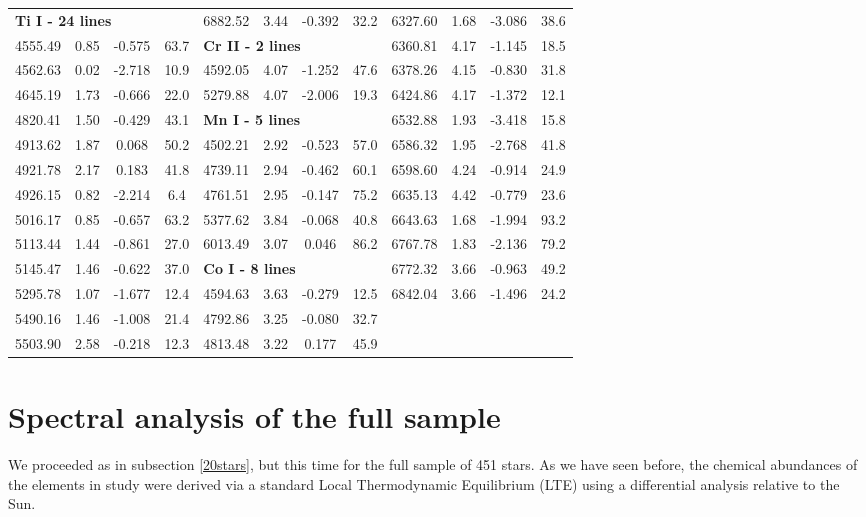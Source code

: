 \documentclass[dvips,12pt,a4paper]{report}
\begin{document}
{{\begin{table}[h]
\begin{tabular}{c c c c | c c c c | c c c c}
\multicolumn{3}{l}{\textbf{Ti I - 24 lines}} & & 6882.52 & 3.44 & -0.392 &  32.2 & 6327.60 & 1.68 & -3.086 &  38.6 \\
4555.49 & 0.85 & -0.575 &  63.7 & \multicolumn{3}{l}{\textbf{Cr II - 2 lines}} &  & 6360.81 & 4.17 & -1.145 &  18.5 \\
4562.63 & 0.02 & -2.718 &  10.9 & 4592.05 & 4.07 & -1.252 &  47.6 & 6378.26 & 4.15 & -0.830 &  31.8 \\
4645.19 & 1.73 & -0.666 &  22.0 & 5279.88 & 4.07 & -2.006 &  19.3 & 6424.86 & 4.17 & -1.372 &  12.1 \\
4820.41 & 1.50 & -0.429 &  43.1 & \multicolumn{3}{l}{\textbf{Mn I - 5 lines}}  &  & 6532.88 & 1.93 & -3.418 &  15.8 \\
4913.62 & 1.87 &  0.068 &  50.2 & 4502.21 & 2.92 & -0.523 &  57.0 & 6586.32 & 1.95 & -2.768 &  41.8 \\
4921.78 & 2.17 &  0.183 &  41.8 & 4739.11 & 2.94 & -0.462 &  60.1 & 6598.60 & 4.24 & -0.914 &  24.9 \\
4926.15 & 0.82 & -2.214 &   6.4 & 4761.51 & 2.95 & -0.147 &  75.2 & 6635.13 & 4.42 & -0.779 &  23.6 \\
5016.17 & 0.85 & -0.657 &  63.2 & 5377.62 & 3.84 & -0.068 &  40.8 & 6643.63 & 1.68 & -1.994 &  93.2 \\
5113.44 & 1.44 & -0.861 &  27.0 & 6013.49 & 3.07 &  0.046 &  86.2 & 6767.78 & 1.83 & -2.136 &  79.2 \\
5145.47 & 1.46 & -0.622 &  37.0 & \multicolumn{3}{l}{\textbf{Co I - 8 lines}} &  & 6772.32 & 3.66 & -0.963 &  49.2 \\
5295.78 & 1.07 & -1.677 &  12.4 & 4594.63 & 3.63 & -0.279 &  12.5 & 6842.04 & 3.66 & -1.496 &  24.2 \\
5490.16 & 1.46 & -1.008 &  21.4 & 4792.86 & 3.25 & -0.080 &  32.7 \\ 
5503.90 & 2.58 & -0.218 &  12.3 & 4813.48 & 3.22 &  0.177 &  45.9 \\
\hline
\end{tabular}
\end {table}

\section {Spectral analysis of the full sample}

We proceeded as in subsection \ref{20stars}, but this time for the full sample of 451 stars. As we have seen before, the chemical abundances of the elements in study were derived via a standard Local Thermodynamic Equilibrium (LTE) using a  differential analysis relative to the Sun. 

}}
\end{document}
